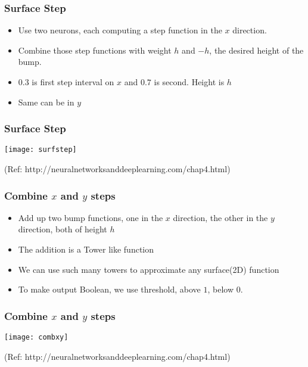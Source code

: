 \begin{frame}[fragile] \frametitle{Surface Step}
\begin{itemize}
\item Use two neurons, each computing a step function in the $x$ direction. 
\item Combine those step functions with weight $h$ and $-h$, the desired height of the bump.
\item $0.3$ is first step interval on $x$ and $0.7$ is second. Height is $h$
\item Same can be in $y$
\end{itemize}

\end{frame}

\begin{frame}[fragile] \frametitle{Surface Step}
\begin{center}
\texttt{[image: surfstep]}
\end{center}
{\tiny (Ref: http://neuralnetworksanddeeplearning.com/chap4.html)}
\end{frame}



\begin{frame}[fragile] \frametitle{Combine $x$ and $y$ steps}
\begin{itemize}
\item Add up two bump functions, one in the $x$ direction, the other in the $y$ direction, both of height $h$
\item The addition is a Tower like function
\item We can use such many towers to approximate any surface(2D) function
\item To make output Boolean, we use threshold, above $1$, below $0$.
\end{itemize}
\end{frame}


\begin{frame}[fragile] \frametitle{Combine $x$ and $y$ steps}
\begin{center}
\texttt{[image: combxy]}
\end{center}
{\tiny (Ref: http://neuralnetworksanddeeplearning.com/chap4.html)}
\end{frame}



